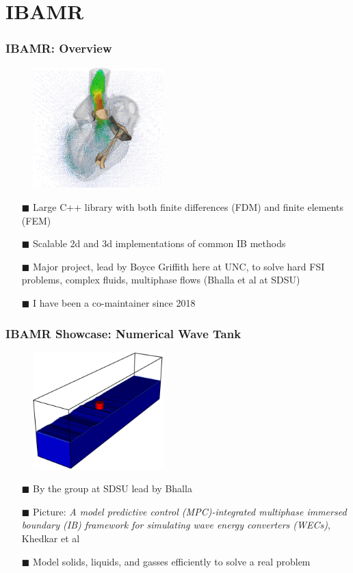 \documentclass[8pt]{beamer}
\begin{document}
\section{IBAMR}
\begin{frame}
    \frametitle{IBAMR: Overview}
    \begin{figure}
        \centering
        \includegraphics[width=2in]{cardiac.png}
    \end{figure}
    \begin{itemize}
        \item[$\blacksquare$] Large C++ library with both finite differences (FDM) and finite elements (FEM)
        \item[$\blacksquare$] Scalable 2d and 3d implementations of common IB methods
        \item[$\blacksquare$] Major project, lead by Boyce Griffith here at UNC, to solve hard FSI problems,
             complex fluids, multiphase flows (Bhalla et al at SDSU)
        \item[$\blacksquare$] I have been a co-maintainer since 2018
    \end{itemize}
\end{frame}

\begin{frame}
    \frametitle{IBAMR Showcase: Numerical Wave Tank}
    \begin{figure}
        \centering
        \includegraphics[width=2in]{wavetank.png}
    \end{figure}
    \begin{itemize}
        \item[$\blacksquare$] By the group at SDSU lead by Bhalla
        \item[$\blacksquare$] Picture: \emph{A model predictive control (MPC)-integrated
        multiphase immersed boundary (IB) framework for simulating wave energy
        converters (WECs)}, Khedkar et al
        \item[$\blacksquare$] Model solids, liquids, and gasses efficiently to solve a real problem
    \end{itemize}
\end{frame}
\end{document}
